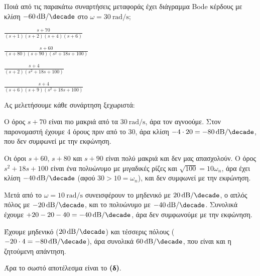 \documentclass[11pt,a4paper,notitlepage,fleqn]{article}
\begin{document}
\begin{exercise}
Ποιά από τις παρακάτω συναρτήσεις μεταφοράς έχει διάγραμμα Bode κέρδους με κλίση
\( \SI{-60}{\decibel/\decade} \) στο \( \omega = \SI{30}{\radian/\second} \);

\begin{enumgreek}
	\item \( \displaystyle \frac{s+70}{(s+1)(s+2)(s+4)(s+6)} \)
	\item \( \displaystyle \frac{s+60}{(s+80)(s+90)(s^2+18s+100)} \)
	\item \( \displaystyle \frac{s+4}{(s+2)(s^2+18s+100)} \)
	\item \( \displaystyle \frac{s+4}{(s+6)(s+9)(s^2+18s+100)} \)
\end{enumgreek}

\tcblower
Ας μελετήσουμε κάθε συνάρτηση ξεχωριστά:
\begin{enumgreek}
	\item Ο όρος \( s+70 \) είναι πιο μακριά από τα \( \SI{30}{\radian/\second} \), άρα
	τον αγνοούμε. Στον παρονομαστή έχουμε 4 όρους πριν από το 30, άρα κλίση
	\( -4\cdot 20 = \SI{-80}{\decibel/\decade} \), που δεν συμφωνεί με την εκφώνηση.
	\item Οι όροι \( s+60 \), \( s+80 \) και \( s+90 \) είναι πολύ μακριά και δεν μας
	απασχολούν. Ο όρος \( s^2+18s+100 \) είναι ένα πολυώνυμο με μιγαδικές ρίζες και
	\( \sqrt{100} = 10\omega_n \), άρα έχει κλίση \( \SI{-40}{\decibel/\decade} \)
	(αφού \( 30 > 10 = \omega_n \)), και
	δεν συμφωνεί με την εκφώνηση.
	\item Μετά από το \( \omega = \SI{10}{\radian/\second} \) συνεισφέρουν το
	μηδενικό με \( \SI{+20}{\decibel/\decade} \), ο απλός πόλος με \( \SI{-20}{\decibel/\decade} \), και το πολυώνυμο με \( \SI{-40}{\decibel/\decade} \).
	Συνολικά έχουμε \( +20 -20 - 40 = \SI{-40}{\decibel/\decade} \), άρα δεν συμφωνούμε με την
	εκφώνηση.
	\item Έχουμε μηδενικό (\( \SI{+20}{\decibel/\decade} \)) και τέσσερις πόλους
	(\( -20\cdot 4 = \SI{-80}{\decibel/\decade} \)), άρα συνολικά \( \SI{60}{\decibel/\decade} \), που είναι και η ζητούμενη απάντηση.
\end{enumgreek}

Άρα το σωστό αποτέλεσμα είναι το \textbf{(δ)}.

\end{exercise}
\end{document}
